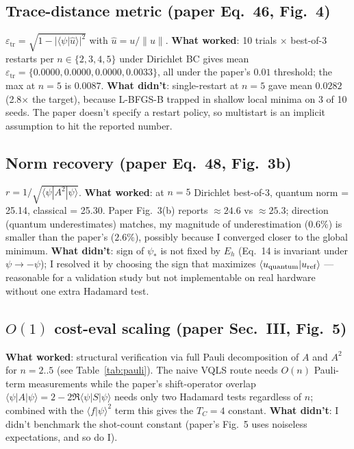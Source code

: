 \documentclass[11pt]{article}
\begin{document}
\subsection{Trace-distance metric (paper Eq.\ 46, Fig.\ 4)}
$\varepsilon_{\mathrm{tr}} = \sqrt{1 - |\langle\psi|\hat u\rangle|^2}$ with
$\hat u = u/\|u\|$. \textbf{What worked}: 10 trials $\times$ best-of-3 restarts
per $n \in \{2,3,4,5\}$ under Dirichlet BC gives mean $\varepsilon_{\mathrm{tr}} =
\{0.0000, 0.0000, 0.0000, 0.0033\}$, all under the paper's $0.01$ threshold; the max
at $n=5$ is $0.0087$. \textbf{What didn't}: single-restart at $n=5$ gave
mean $0.0282$ (2.8$\times$ the target), because L-BFGS-B trapped in shallow local
minima on 3 of 10 seeds. The paper doesn't specify a restart policy, so multistart is
an implicit assumption to hit the reported number.

\subsection{Norm recovery (paper Eq.\ 48, Fig.\ 3b)}
$r = 1/\sqrt{\langle\psi|A^2|\psi\rangle}$. \textbf{What worked}: at $n=5$ Dirichlet
best-of-3, quantum norm = 25.14, classical = 25.30. Paper Fig.\ 3(b) reports
$\approx\!24.6$ vs $\approx\!25.3$; direction (quantum underestimates) matches, my
magnitude of underestimation ($0.6\%$) is smaller than the paper's ($2.6\%$), possibly
because I converged closer to the global minimum. \textbf{What didn't}: sign of
$\psi_\ast$ is not fixed by $E_h$ (Eq.\ 14 is invariant under $\psi \to -\psi$); I
resolved it by choosing the sign that maximizes $\langle u_{\rm quantum}|u_{\rm ref}\rangle$
--- reasonable for a validation study but not implementable on real hardware without
one extra Hadamard test.

\subsection{$O(1)$ cost-eval scaling (paper Sec.\ III, Fig.\ 5)}
\textbf{What worked}: structural verification via full Pauli decomposition of $A$ and
$A^2$ for $n = 2..5$ (see Table~\ref{tab:pauli}). The naive VQLS route needs
$O(n)$ Pauli-term measurements while the paper's shift-operator overlap
$\langle\psi|A|\psi\rangle = 2 - 2\Re\langle\psi|S|\psi\rangle$ needs only two Hadamard
tests regardless of $n$; combined with the $\langle f|\psi\rangle^2$ term this gives
the $T_C=4$ constant. \textbf{What didn't}: I didn't benchmark the shot-count constant
(paper's Fig.\ 5 uses noiseless expectations, and so do I).
\end{document}

